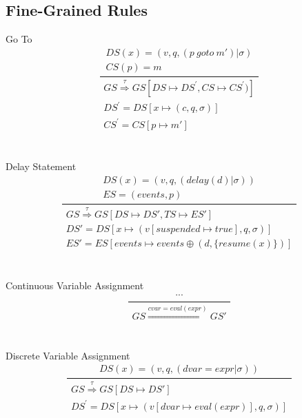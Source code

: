 \documentclass[]{article}
\begin{document}
\subsection{Fine-Grained Rules}
Go To
\begin{equation}\label{GoTo}
\frac
{
	\begin{gathered}
	DS(x)=(v,q,(p \ goto \ m')|\sigma) \\
	 CS(p)=m
	\end{gathered}
}
{
	\begin{gathered}
	GS\overset{\tau}{\Rightarrow}GS[DS\longmapsto DS^{'}, CS\longmapsto CS^{'})]  \\
	DS^{'}=DS[x\longmapsto(c,q,\sigma)]  \\ 
	CS^{'}=CS[p\longmapsto m']
	\end{gathered}
}
\end{equation}
\\\\
Delay Statement
\begin{equation}\label{DelayStatement}
\frac
{
	\begin{gathered}
	DS(x)=(v,q,(delay(d)|\sigma))  \\ ES= (events,p)
	\end{gathered}
}
{
	\begin{gathered}
	GS\overset{\tau}{\Rightarrow}GS[DS\longmapsto DS', TS\longmapsto ES']  \\
	DS'=DS[x\longmapsto(v[suspended\longmapsto true],q,\sigma)]  \\ 
	ES'=ES[events \longmapsto events \oplus (d,\{resume(x)\})]
	\end{gathered}
}
\end{equation}
\\\\
Continuous Variable Assignment 
\begin{equation}\label{ContinuousVariableAssignment}
\frac
{
	\begin{gathered}
	...
	\end{gathered}
}
{
	\begin{gathered}
	GS\overset{cvar=eval(expr)}{\Rightarrow}GS'
	\end{gathered}
}
\end{equation}
\\\\
Discrete Variable Assignment
\begin{equation}\label{DiscreteVariableAssignment}
\frac
{
	\begin{gathered}
	DS(x)=(v,q,(dvar=expr|\sigma))
	\end{gathered}
}
{
	\begin{gathered}
	GS\overset{\tau}{\Rightarrow}GS[DS\longmapsto DS']  \\
	 DS^{'}=DS[x \longmapsto(v[dvar\longmapsto eval(expr)],q,\sigma)]
	\end{gathered}
}
\end{equation}
\end{document}
